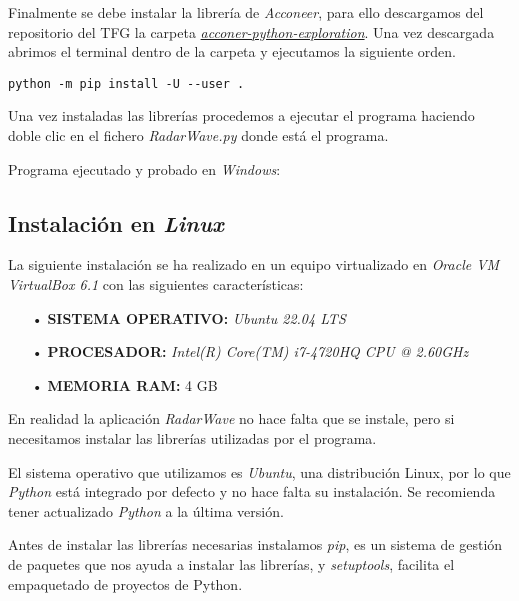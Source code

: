 
Finalmente se debe instalar la librería de \textit{Acconeer}, para ello descargamos del repositorio del TFG la carpeta \href{https://github.com/mecyc/TFG_RADAR_60GHZ/tree/main/acconeer-python-exploration}{\textit{acconer-python-exploration}}. Una vez descargada abrimos el terminal dentro de la carpeta y ejecutamos la siguiente orden.\cite{Acconeer2021}

\begin{verbatim}
python -m pip install -U --user .
\end{verbatim}


Una vez instaladas las librerías procedemos a ejecutar el programa haciendo doble clic en el fichero \textit{RadarWave.py} donde está el programa.

Programa ejecutado y probado en \textit{Windows}:


\subsection{Instalación en \textit{Linux}}

La siguiente instalación se ha realizado en un equipo virtualizado en \textit{Oracle VM VirtualBox 6.1} con las siguientes características:
\begin{itemize}
\item[•] \textbf{SISTEMA OPERATIVO:} \textit{Ubuntu 22.04 LTS}
\item[•] \textbf{PROCESADOR:} \textit{Intel(R) Core(TM) i7-4720HQ CPU @ 2.60GHz}
\item[•] \textbf{MEMORIA RAM:} 4 GB
\end{itemize}

En realidad la aplicación \textit{RadarWave} no hace falta que se instale, pero si necesitamos instalar las librerías utilizadas por el programa.

El sistema operativo que utilizamos es \textit{Ubuntu}, una distribución {Linux}, por lo que \textit{Python} está integrado por defecto y no hace falta su instalación. Se recomienda tener actualizado \textit{Python} a la última versión.

Antes de instalar las librerías necesarias instalamos \textit{pip}, es un sistema de gestión de paquetes que nos ayuda a instalar las librerías, y \textit{setuptools}, facilita el empaquetado de proyectos de Python.

